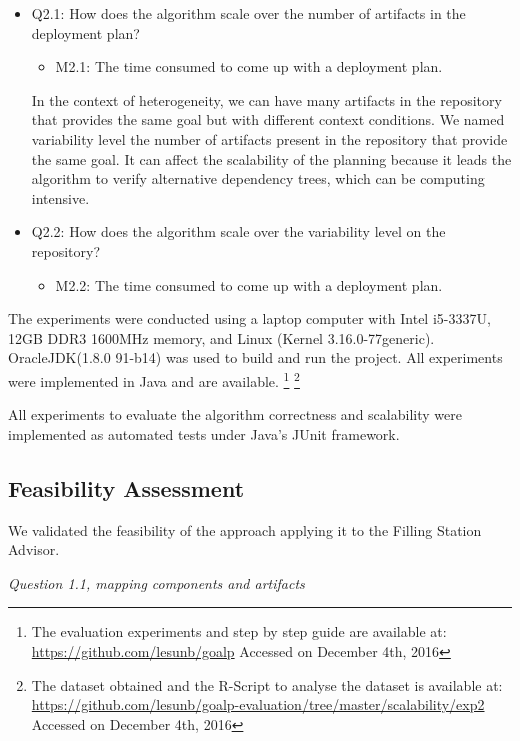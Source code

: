 \begin{itemize}
  \item Q2.1: How does the algorithm scale over the number of artifacts in the deployment plan?
  \begin{itemize}
    \item M2.1: The time consumed to come up with a deployment plan.
  \end{itemize}

  In the context of heterogeneity, we can have many artifacts in the repository that provides the same goal but with different context conditions.
  We named variability level the number of artifacts present in the repository that provide the same goal. It can affect the scalability of the planning because it leads the algorithm to verify alternative dependency trees, which can be computing intensive.

  \item Q2.2: How does the algorithm scale over the variability level on the repository?
  \begin{itemize}
    \item M2.2: The time consumed to come up with a deployment plan.
  \end{itemize}
\end{itemize}

The experiments were conducted using a laptop computer with Intel i5-3337U, 12GB DDR3 1600MHz memory, and Linux (Kernel 3.16.0-77generic). OracleJDK(1.8.0 91-b14) was used to build and run the project. All experiments were implemented in Java and are available.
\footnote{The evaluation experiments and step by step guide are available at:
\url{https://github.com/lesunb/goalp} Accessed on December 4th, 2016}
\footnote{The dataset obtained and the R-Script to analyse the dataset is available at:
\url{https://github.com/lesunb/goalp-evaluation/tree/master/scalability/exp2} Accessed on December 4th, 2016}


All experiments to evaluate the algorithm correctness and scalability
were implemented as automated tests under Java’s JUnit framework.

\subsection{Feasibility Assessment}

We validated the feasibility of the approach applying it to the Filling Station Advisor.

\emph{Question 1.1, mapping components and artifacts }

